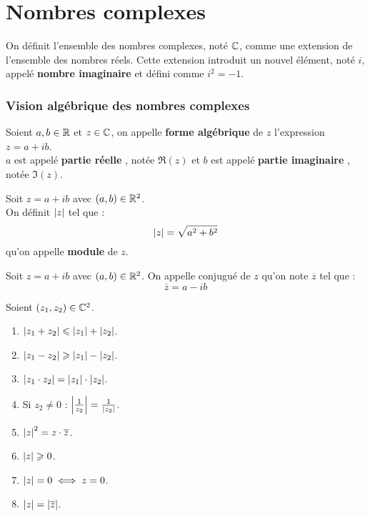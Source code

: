 \chapter{Nombres complexes}

On définit l'ensemble des nombres complexes, noté $\mathbb{C}$, comme une extension de l'ensemble des nombres réels.
Cette extension introduit un nouvel élément, noté $i$, appelé \textbf{nombre imaginaire} et défini comme $i^2=-1$.

\subsection{Vision algébrique des nombres complexes}
\begin{definition}
    Soient $a, b \in \mathbb{R}$ et $z \in \mathbb{C}$, on appelle \textbf{forme algébrique} de $z$ l'expression $z = a + ib$.
    \\
    $a$ est appelé \og \textbf{partie réelle} \fg, notée $\Re(z)$ et $b$ est appelé \og \textbf{partie imaginaire} \fg, notée $\Im(z)$.
\end{definition}

\begin{definition}
    Soit $z = a + ib$ avec $(a, b) \in \mathbb{R}^2$. 
    \\
    On définit $\abs{z}$ tel que :
    \[ \abs{z} = \sqrt{a^2 + b^2} \]
    qu'on appelle \textbf{module} de $z$.
\end{definition}

\begin{definition}
    Soit $z = a + ib$ avec $(a, b) \in \mathbb{R}^2$. On appelle conjugué de $z$ qu'on note $\overline{z}$ tel que :
    \[ \overline{z} = a - ib \]
\end{definition}

\begin{proposition}
    Soient $(z_1, z_2) \in \mathbb{C}^2$.
    \begin{multicols}{3}
        \begin{enumerate}
            \item $\abs{z_1 + z_2} \leqslant \abs{z_1} + \abs{z_2}$.
            \item $\abs{z_1 - z_2} \geqslant \abs{z_1} - \abs{z_2}$.
            \item $\abs{z_1 \cdot z_2} = \abs{z_1} \cdot \abs{z_2}$.
            \item Si $z_2 \neq 0$ : $\abs{\frac{1}{z_2}} = \frac{1}{\abs{z_2}}$.
            \item $\abs{z}^2 = z \cdot \overline{z}$.
            \item $\abs{z} \geqslant 0$.
            \item $\abs{z} = 0 \iff z = 0$.
            \item $\abs{z} = \abs{\overline{z}}$.
        \end{enumerate}
    \end{multicols}
\end{proposition}

